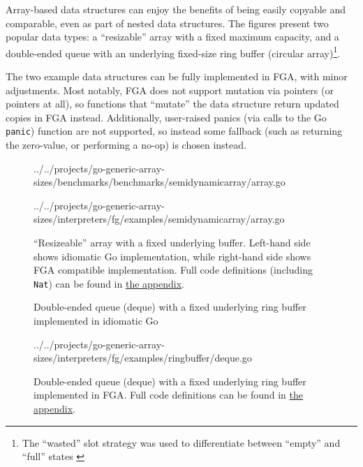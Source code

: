 Array-based data structures can enjoy the benefits of being easily copyable and
comparable, even as part of nested data structures. The figures present two
popular data types: a ``resizable'' array with a fixed maximum capacity, and a
double-ended queue with an underlying fixed-size ring buffer (circular
array)\footnote{The ``wasted'' slot strategy was used to differentiate between
	``empty'' and ``full'' states \autocite{ringBuffer}}.

The two example data structures can be fully implemented in FGA, with minor
adjustments. Most notably, FGA does not support mutation via pointers (or
pointers at all), so functions that ``mutate'' the data structure return updated
copies in FGA instead. Additionally, user-raised panics (via calls to the Go
\texttt{panic}) function are not supported, so instead some fallback (such as
returning the zero-value, or performing a no-op) is chosen instead.

\begin{figure}
	\noindent\begin{minipage}[t]{.45\linewidth}
		
		{../../projects/go-generic-array-sizes/benchmarks/benchmarks/semidynamicarray/array.go}
	\end{minipage}
	\hfill
	\noindent\begin{minipage}[t]{.45\linewidth}
		
		{../../projects/go-generic-array-sizes/interpreters/fg/examples/semidynamicarray/array.go}
	\end{minipage}
	\caption{ ``Resizeable'' array with a fixed underlying buffer. Left-hand side
		shows idiomatic Go implementation, while right-hand side shows FGA
		compatible implementation. Full code definitions (including
		\texttt{Nat}) can be found in \hyperref[sec:fg-resizable-array-code]{the
			appendix}.}
\end{figure}

\begin{figure}
	\caption{Double-ended queue (deque) with a fixed underlying ring buffer implemented in idiomatic Go}
\end{figure}

\begin{figure}
	
	{../../projects/go-generic-array-sizes/interpreters/fg/examples/ringbuffer/deque.go}
	\caption{Double-ended queue (deque) with a fixed underlying ring buffer
		implemented in FGA. Full code definitions can be
		found in \hyperref[sec:fg-deque-code]{the appendix}.}
\end{figure}
